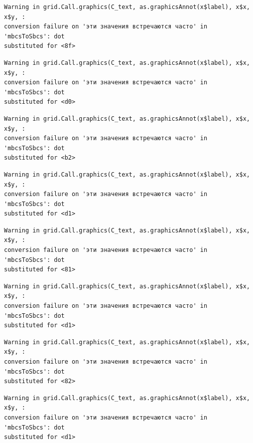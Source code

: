 \documentclass[
  letterpaper,
  DIV=11,
  numbers=noendperiod]{scrreprt}
\theoremstyle{definition}
\theoremstyle{remark}
\begin{document}
\begin{verbatim}
Warning in grid.Call.graphics(C_text, as.graphicsAnnot(x$label), x$x, x$y, :
conversion failure on 'эти значения встречаются часто' in 'mbcsToSbcs': dot
substituted for <8f>
\end{verbatim}

\begin{verbatim}
Warning in grid.Call.graphics(C_text, as.graphicsAnnot(x$label), x$x, x$y, :
conversion failure on 'эти значения встречаются часто' in 'mbcsToSbcs': dot
substituted for <d0>
\end{verbatim}

\begin{verbatim}
Warning in grid.Call.graphics(C_text, as.graphicsAnnot(x$label), x$x, x$y, :
conversion failure on 'эти значения встречаются часто' in 'mbcsToSbcs': dot
substituted for <b2>
\end{verbatim}

\begin{verbatim}
Warning in grid.Call.graphics(C_text, as.graphicsAnnot(x$label), x$x, x$y, :
conversion failure on 'эти значения встречаются часто' in 'mbcsToSbcs': dot
substituted for <d1>
\end{verbatim}

\begin{verbatim}
Warning in grid.Call.graphics(C_text, as.graphicsAnnot(x$label), x$x, x$y, :
conversion failure on 'эти значения встречаются часто' in 'mbcsToSbcs': dot
substituted for <81>
\end{verbatim}

\begin{verbatim}
Warning in grid.Call.graphics(C_text, as.graphicsAnnot(x$label), x$x, x$y, :
conversion failure on 'эти значения встречаются часто' in 'mbcsToSbcs': dot
substituted for <d1>
\end{verbatim}

\begin{verbatim}
Warning in grid.Call.graphics(C_text, as.graphicsAnnot(x$label), x$x, x$y, :
conversion failure on 'эти значения встречаются часто' in 'mbcsToSbcs': dot
substituted for <82>
\end{verbatim}

\begin{verbatim}
Warning in grid.Call.graphics(C_text, as.graphicsAnnot(x$label), x$x, x$y, :
conversion failure on 'эти значения встречаются часто' in 'mbcsToSbcs': dot
substituted for <d1>
\end{verbatim}
\end{document}
